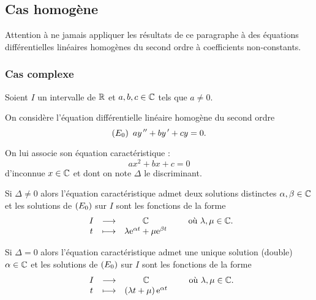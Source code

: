 \begin{dem}
\end{dem}

\subsection{Cas homogène}

\begin{rem}
Attention à ne jamais appliquer les résultats de ce paragraphe à des équations différentielles linéaires homogènes du second ordre à coefficients non-constants.
\end{rem}

\subsubsection{Cas complexe}

\begin{prop}
Soient \(I\) un intervalle de \(\mathbb{R}\) et \(a,b,c\in\mathbb{C}\) tels que \(a\not=0\).

On considère l'équation différentielle linéaire homogène du second ordre \[\left(E_0\right)~ay^{\,\prime\prime}+by^{\,\prime}+cy=0.\]

On lui associe son équation caractéristique : \[ax^2+bx+c=0\] d'inconnue \(x\in\mathbb{C}\) et dont on note \(\Delta\) le discriminant.

Si \(\Delta\not=0\) alors l'équation caractéristique admet deux solutions distinctes \(\alpha,\beta\in\mathbb{C}\) et les solutions de \(\left(E_0\right)\) sur \(I\) sont les fonctions de la forme \[\begin{array}[t]{ccc}I & \longrightarrow & \mathbb{C} \\ t & \longmapsto & \lambda\mathrm{e}^{\alpha t}+\mu\mathrm{e}^{\beta t}\end{array}\qquad\text{où }\lambda,\mu\in\mathbb{C}.\]

Si \(\Delta=0\) alors l'équation caractéristique admet une unique solution (double) \(\alpha\in\mathbb{C}\) et les solutions de \(\left(E_0\right)\) sur \(I\) sont les fonctions de la forme \[\begin{array}[t]{ccc}I & \longrightarrow & \mathbb{C} \\ t & \longmapsto & \left(\lambda t+\mu\right)\mathrm{e}^{\alpha t}\end{array}\qquad\text{où }\lambda,\mu\in\mathbb{C}.\]
\end{prop}

